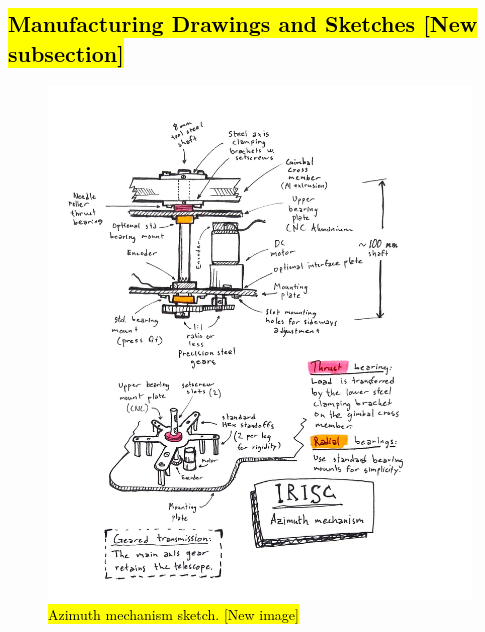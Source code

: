\subsection{\hl{Manufacturing Drawings and Sketches [New subsection]}}
\label{sec:mech_drawings}
\begin{figure}[h!] 
		\includegraphics[width=\textwidth]{appendix/img/mechanical_sketches/azimuth_mechanism.jpg}
		\caption{\hl{Azimuth mechanism sketch. [New image]}}
		\label{img:az_sketch}
\end{figure}
\newpage
